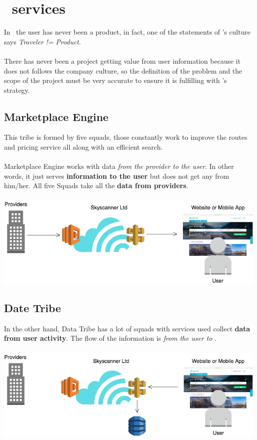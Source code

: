 \section{\company\ services}

In \company\ the user has never been a product, in fact, one of the statements of \company's culture says \textit{Traveler != Product}\cite{the_road_ahead}.
\\\\
There has never been a project getting value from user information because it does not follows the company culture, so the definition of the problem and the scope of the project must be very accurate to ensure it is fulfilling with \company's strategy\cite{skyscanner_strategy}.

\subsection{Marketplace Engine}

This tribe is formed by five squads, those constantly work to improve the routes and pricing service all along with an efficient search.
\\\\
Marketplace Engine works with data \textit{from the provider to the user}. In other words, it just serves \textbf{information to the user} but does not get any from him/her. All five Squads take all the \textbf{data from providers}.
\\\\
\includegraphics[scale=0.5]{diagrams/state-of-the-art-tribes-mp.png}

\subsection{Date Tribe}

In the other hand, Data Tribe has a lot of squads with services used collect \textbf{data from user activity}. The flow of the information is \textit{from the user to \company}.
\\\\
\includegraphics[scale=0.5]{diagrams/state-of-the-art-tribes-data.png}

